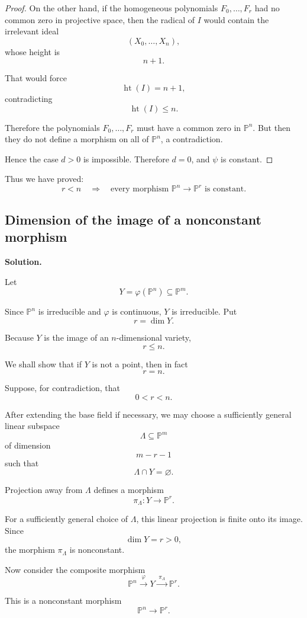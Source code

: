 \documentclass[12pt,a4paper]{article}
\providecommand{\Pj}{\mathbb P}
\theoremstyle{notespace}
\begin{document}
\begin{proof}
	On the other hand, if the homogeneous polynomials \(F_0,\dots,F_r\) had no common zero in projective space, then the radical of \(I\) would contain the irrelevant ideal
	\[
	(X_0,\dots,X_n),
	\]
	whose height is
	\[
	n+1.
	\]
	
	That would force
	\[
	\operatorname{ht}(I)=n+1,
	\]
	contradicting
	\[
	\operatorname{ht}(I)\leq n.
	\]
	
	Therefore the polynomials \(F_0,\dots,F_r\) must have a common zero in \(\Pj^n\). But then they do not define a morphism on all of \(\Pj^n\), a contradiction.
	
	Hence the case \(d>0\) is impossible. Therefore \(d=0\), and \(\psi\) is constant.
\end{proof}

Thus we have proved:
\[
\boxed{
	r<n
	\quad\Longrightarrow\quad
	\text{every morphism }\Pj^n\to \Pj^r\text{ is constant.}
}
\]

\subsection{Dimension of the image of a nonconstant morphism}

\textbf{Solution.}

Let
\[
Y=\varphi(\Pj^n)\subseteq \Pj^m.
\]

Since \(\Pj^n\) is irreducible and \(\varphi\) is continuous, \(Y\) is irreducible. Put
\[
r=\dim Y.
\]

Because \(Y\) is the image of an \(n\)-dimensional variety,
\[
r\leq n.
\]

We shall show that if \(Y\) is not a point, then in fact
\[
r=n.
\]

Suppose, for contradiction, that
\[
0<r<n.
\]

After extending the base field if necessary, we may choose a sufficiently general linear subspace
\[
\Lambda\subseteq \Pj^m
\]
of dimension
\[
m-r-1
\]
such that
\[
\Lambda\cap Y=\varnothing.
\]

Projection away from \(\Lambda\) defines a morphism
\[
\pi_{\Lambda}:Y\longrightarrow \Pj^r.
\]

For a sufficiently general choice of \(\Lambda\), this linear projection is finite onto its image. Since
\[
\dim Y=r>0,
\]
the morphism \(\pi_{\Lambda}\) is nonconstant.

Now consider the composite morphism
\[
\Pj^n
\xrightarrow{\;\varphi\;}
Y
\xrightarrow{\;\pi_{\Lambda}\;}
\Pj^r.
\]

This is a nonconstant morphism
\[
\Pj^n\longrightarrow \Pj^r.
\]
\end{document}
